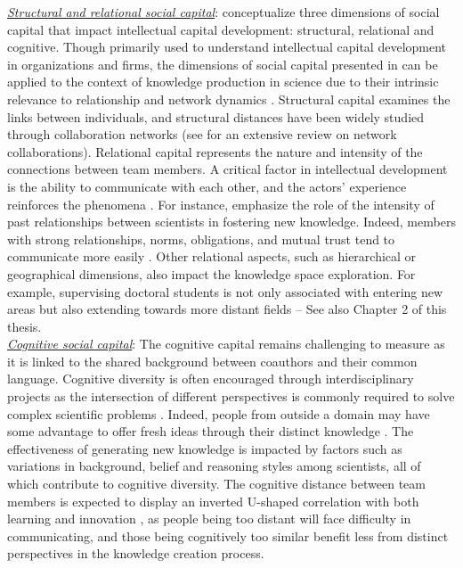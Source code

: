         \underline{\textit{Structural and relational social capital}}: \cite{nahapiet1998social} conceptualize three dimensions of social capital that impact intellectual capital development: structural, relational and cognitive. 
        Though primarily used to understand intellectual capital development in organizations and firms, the dimensions of social capital presented in \cite{nahapiet1998social} can be applied to the context of knowledge production in science due to their intrinsic relevance to relationship and network dynamics \citep{liao2011improve}. Structural capital examines the links between individuals, and structural distances have been widely studied through collaboration networks (see \cite{kumar2015co} for an extensive review on network collaborations). Relational capital represents the nature and intensity of the connections between team members. A critical factor in intellectual development is the ability to communicate with each other, and the actors' experience reinforces the phenomena \citep{taylor2006superman, liao2011improve, kelchtermans2020off}. For instance, \cite{mcfadyen2004social} emphasize the role of the intensity of past relationships between scientists in fostering new knowledge. Indeed, members with strong relationships, norms, obligations, and mutual trust tend to communicate more easily \citep{liao2011improve}. Other relational aspects, such as hierarchical or geographical dimensions, also impact the knowledge space exploration. For example, supervising doctoral students is not only associated with entering new areas but also extending towards more distant fields \citep{kelchtermans2020off} -- See also Chapter 2 of this thesis. \\

        
        \underline{\textit{Cognitive social capital}}: The cognitive capital remains challenging to measure as it is linked to the shared background between coauthors and their common language. Cognitive diversity is often encouraged through interdisciplinary projects as the intersection of different perspectives is commonly required to solve complex scientific problems \citep{page2007}. Indeed, people from outside a domain may have some advantage to offer fresh ideas through their distinct knowledge \citep{jeppesen2010marginality,kuhn1962structure}. The effectiveness of generating new knowledge is impacted by factors such as variations in background, belief and reasoning styles among scientists, all of which contribute to cognitive diversity. The cognitive distance between team members is expected to display an inverted U-shaped correlation with both learning and innovation \citep{nooteboom2007optimal}, as people being too distant will face difficulty in communicating, and those being cognitively too similar benefit less from distinct perspectives in the knowledge creation process.
        
